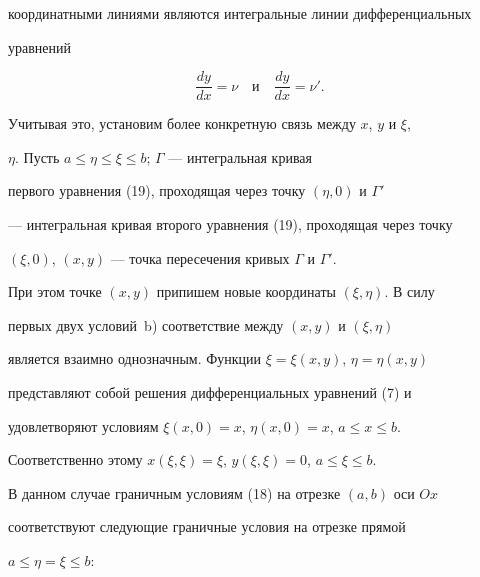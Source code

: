 координатными линиями являются интегральные линии дифференциальных 


уравнений 


\begin{equation} 


\frac{d y}{d x}=\nu\quad\text{и}\quad 


\frac{d y}{d x}=\nu'. 


\end{equation} 


Учитывая это, установим более конкретную связь между $x$, $y$ и $\xi$, 


$\eta$. Пусть $a\le\eta\le\xi\le b$; $\Gamma$ --- интегральная кривая 


первого уравнения (19), проходящая через точку $(\eta,0)$ и $\Gamma'$ 


--- интегральная кривая второго уравнения (19), проходящая через точку 


$(\xi,0)$, $(x,y)$ --- точка пересечения кривых $\Gamma$ и $\Gamma'$. 


При этом точке $(x,y)$ припишем новые координаты $(\xi,\eta)$. В силу 


первых двух условий~b) соответствие между $(x,y)$ и $(\xi,\eta)$ 


является взаимно однозначным. Функции $\xi=\xi(x,y)$, $\eta=\eta(x,y)$ 


представляют собой решения дифференциальных уравнений (7) и 


удовлетворяют условиям $\xi(x,0)=x$, $\eta(x,0)=x$, $a\le x\le b$. 


Соответственно этому $x(\xi,\xi)=\xi$, $y(\xi,\xi)=0$, $a\le\xi\le b$. 


В данном случае граничным условиям (18) на отрезке $(a,b)$ оси $Ox$ 


соответствуют следующие граничные условия на отрезке прямой 


$a\le\eta=\xi\le b$: 


